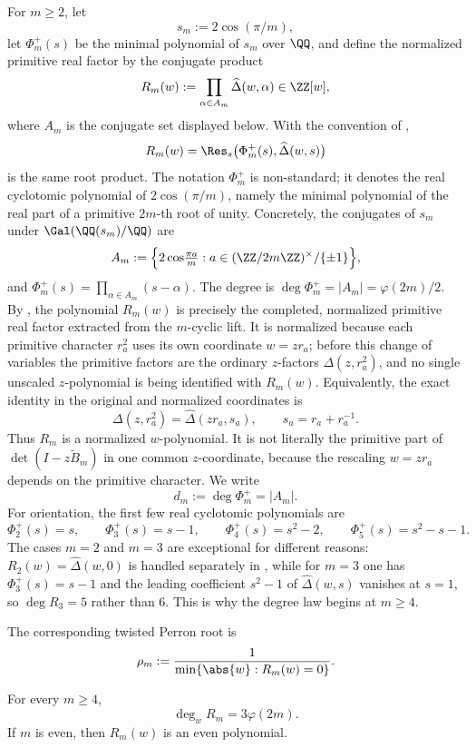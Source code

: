 For \(m\ge 2\), let
\[
  s_m:=2\cos(\pi/m),
\]
let \(\Phi_m^+(s)\) be the minimal polynomial of \(s_m\) over \(\QQ\), and
define the normalized primitive real factor by the conjugate product
\[
  R_m(w):=\prod_{\alpha\in A_m}\widehat\Delta(w,\alpha)\in\ZZ[w],
\]
where \(A_m\) is the conjugate set displayed below. With the convention
of ,
\[
  R_m(w)=\Res_s\bigl(\Phi_m^+(s),\widehat\Delta(w,s)\bigr)
\]
is the same root product.
The notation \(\Phi_m^+\) is non-standard; it denotes the real
cyclotomic polynomial of \(2\cos(\pi/m)\), namely the minimal
polynomial of the real part of a primitive \(2m\)-th root of unity.
Concretely, the conjugates of \(s_m\) under \(\Gal(\QQ(s_m)/\QQ)\) are
\[
  A_m:=\Bigl\{2\cos\!\tfrac{\pi a}{m}:a\in(\ZZ/2m\ZZ)^\times/\{\pm 1\}\Bigr\},
\]
and \(\Phi_m^+(s)=\prod_{\alpha\in A_m}(s-\alpha)\). The degree is
\(\deg\Phi_m^+=|A_m|=\varphi(2m)/2\). By
, the polynomial \(R_m(w)\) is
precisely the completed, normalized primitive real factor extracted from
the \(m\)-cyclic lift. It is normalized because each primitive character
\(r_a^2\) uses its own coordinate \(w=zr_a\); before this change of
variables the primitive factors are the ordinary \(z\)-factors
\(\Delta(z,r_a^2)\), and no single unscaled \(z\)-polynomial is being
identified with \(R_m(w)\). Equivalently, the exact identity in the
original and normalized coordinates is
\[
  \Delta(z,r_a^2)=\widehat\Delta(zr_a,s_a),
  \qquad s_a=r_a+r_a^{-1}.
\]
Thus \(R_m\) is a normalized \(w\)-polynomial. It is not literally the
primitive part of \(\det(I-z\widetilde B_m)\) in one common
\(z\)-coordinate, because the rescaling \(w=zr_a\) depends on the
primitive character. We write
\[
  d_m:=\deg\Phi_m^+=|A_m|.
\]
For orientation, the first few real cyclotomic polynomials are
\[
  \Phi_2^+(s)=s,\qquad
  \Phi_3^+(s)=s-1,\qquad
  \Phi_4^+(s)=s^2-2,\qquad
  \Phi_5^+(s)=s^2-s-1.
\]
The cases \(m=2\) and \(m=3\) are exceptional for different reasons:
\(R_2(w)=\widehat\Delta(w,0)\) is handled separately in
, while for \(m=3\) one has
\(\Phi_3^+(s)=s-1\) and the leading coefficient \(s^2-1\) of
\(\widehat\Delta(w,s)\) vanishes at \(s=1\), so \(\deg R_3=5\) rather
than \(6\). This is why the degree law begins at \(m\ge 4\).

The corresponding twisted Perron root is
\[
  \rho_m:=\frac{1}{\min\{\abs{w}:R_m(w)=0\}}.
\]


\begin{theorem}
  \label{thm:sync-cyclotomic-degree-law}
  For every \(m\ge 4\),
  \[
    \deg_w R_m=3\varphi(2m).
  \]
  If \(m\) is even, then \(R_m(w)\) is an even polynomial.
\end{theorem}

